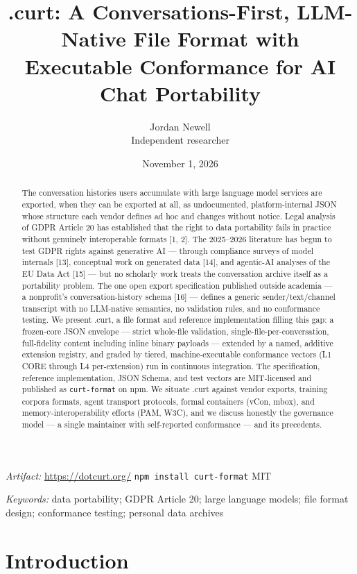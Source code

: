 \documentclass[11pt]{article}
\title{.curt: A Conversations-First, LLM-Native File Format with\\ Executable Conformance for AI Chat Portability}
\author{Jordan Newell\\[2pt]\small Independent researcher}
\date{November 1, 2026}
\begin{document}
\maketitle

\begin{abstract}
The conversation histories users accumulate with large language model services are exported, when they can be exported at all, as undocumented, platform-internal JSON whose structure each vendor defines ad hoc and changes without notice. Legal analysis of GDPR Article 20 has established that the right to data portability fails in practice without genuinely interoperable formats [1, 2]. The 2025--2026 literature has begun to test GDPR rights against generative AI --- through compliance surveys of model internals [13], conceptual work on generated data [14], and agentic-AI analyses of the EU Data Act [15] --- but no scholarly work treats the conversation archive itself as a portability problem. The one open export specification published outside academia --- a nonprofit's conversation-history schema [16] --- defines a generic sender/text/channel transcript with no LLM-native semantics, no validation rules, and no conformance testing. We present .curt, a file format and reference implementation filling this gap: a frozen-core JSON envelope --- strict whole-file validation, single-file-per-conversation, full-fidelity content including inline binary payloads --- extended by a named, additive extension registry, and graded by tiered, machine-executable conformance vectors (L1 CORE through L4 per-extension) run in continuous integration. The specification, reference implementation, JSON Schema, and test vectors are MIT-licensed and published as \texttt{curt-format} on npm. We situate .curt against vendor exports, training corpora formats, agent transport protocols, formal containers (vCon, mbox), and memory-interoperability efforts (PAM, W3C), and we discuss honestly the governance model --- a single maintainer with self-reported conformance --- and its precedents.
\end{abstract}

\noindent\textit{Artifact:} \url{https://dotcurt.org/} \textperiodcentered{} \texttt{npm install curt-format} \textperiodcentered{} MIT

\smallskip
\noindent\textit{Keywords:} data portability; GDPR Article 20; large language models; file format design; conformance testing; personal data archives

\section{Introduction}
\end{document}
